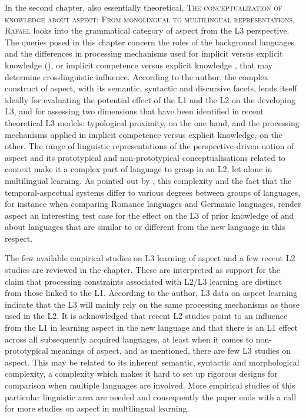 \documentclass[output=paper,colorlinks,citecolor=brown,nonflat]{langsci/langscibook}
\begin{document}
In the second chapter, also essentially theoretical, \textsc{The conceptualization of knowledge about aspect: From monolingual to multilingual representations, Rafael \citeauthor{chapters/salaberry}} looks into the grammatical category of aspect from the L3 perspective. The queries posed in this chapter concern the roles of the background languages and the differences in processing mechanisms used for implicit versus explicit knowledge (\citealt{EllisN2005}), or implicit competence versus explicit knowledge \citep{Paradis2009}, that may determine crosslinguistic influence. According to the author, the complex construct of aspect, with its semantic, syntactic and discursive facets, lends itself ideally for evaluating the potential effect of the L1 and the L2 on the developing L3, and for assessing two dimensions that have been identified in recent theoretical L3 models: typological proximity, on the one hand, and the processing mechanisms applied in implicit competence versus explicit knowledge, on the other. The range of linguistic representations of the perspective-driven notion of aspect and its prototypical and non-prototypical conceptualisations related to context make it a complex part of language to grasp in an L2, let alone in multilingual learning. As pointed out by \citeauthor{chapters/salaberry}, this complexity and the fact that the temporal-aspectual systems differ to various degrees between groups of languages, for instance when comparing Romance languages and Germanic languages, render aspect an interesting test case for the effect on the L3 of prior knowledge of and about languages that are similar to or different from the new language in this respect.


The few available empirical studies on L3 learning of aspect and a few recent L2 studies are reviewed in the chapter. These are interpreted as support for the claim that processing constraints associated with L2/L3 learning are distinct from those linked to the L1. According to the author, L3 data on aspect learning indicate that the L3 will mainly rely on the same processing mechanisms as those used in the L2. It is acknowledged that recent L2 studies point to an influence from the L1 in learning aspect in the new language and that there is an L1 effect across all subsequently acquired languages, at least when it comes to non-prototypical meanings of aspect, and as mentioned, there are few L3 studies on aspect. This may be related to its inherent semantic, syntactic and morphological complexity, a complexity which makes it hard to set up rigorous designs for comparison when multiple languages are involved. More empirical studies of this particular linguistic area are needed and consequently the paper ends with a call for more studies on aspect in multilingual learning.
\end{document}
